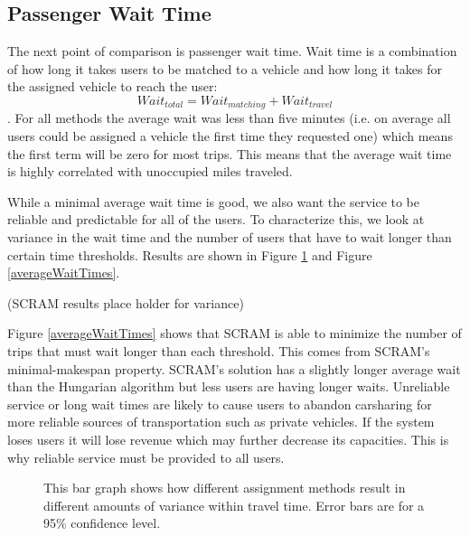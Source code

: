 \documentclass[letterpaper]{article}
\begin{document}
\subsection{Passenger Wait Time}

The next point of comparison is passenger wait time. Wait time is a combination of how long it takes users to be matched to a vehicle and how long it takes for the assigned vehicle to reach the user:
$$Wait_{total} = Wait_{matching} + Wait_{travel} $$
. For all methods the average wait was less than five minutes (i.e. on average all users could be assigned a vehicle the first time they requested one) which means the first term will be zero for most trips. This means that the average wait time is highly correlated with unoccupied miles traveled. 

While a minimal average wait time is good, we also want the service to be reliable and predictable for all of the users. To characterize this, we look at variance in the wait time and the number of users that have to wait longer than certain time thresholds. Results are shown in Figure \ref{averageWaitVarianceGraph} and Figure \ref{averageWaitTimes}.

(SCRAM results place holder for variance)

Figure \ref{averageWaitTimes} shows that SCRAM is able to minimize the number of trips that must wait longer than each threshold. This comes from SCRAM's minimal-makespan property. SCRAM's solution has a slightly longer average wait than the Hungarian algorithm but less users are having longer waits. Unreliable service or long wait times are likely to cause users to abandon carsharing for more reliable sources of transportation such as private vehicles. If the system loses users it will lose revenue which may further decrease its capacities. This is why reliable service must be provided to all users.

\begin{figure}

\label{averageWaitVarianceGraph}
\caption{This bar graph shows how different assignment methods result in different amounts of variance within travel time. Error bars are for a 95$\%$ confidence level.}
\end{figure}
\end{document}
